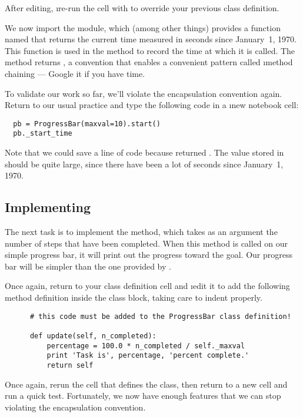 \documentclass[letterpaper, 12pt, titlepage, twoside]{article}
\begin{document}
After editing, \i{re-run the cell} with  to override your
previous class definition.

We now import the  module, which (among other things) provides a
function named  that returns the current time measured in seconds
since January~1, 1970. This function is used in the  method to
record the time at which it is called. The  method returns
, a convention that enables a convenient pattern called \i{method
  chaining} --- Google it if you have time.

To validate our work so far, we'll violate the encapsulation convention again.
Return to our usual practice and type the following code in a \i{new} notebook
cell:

\begin{lstlisting}
  pb = ProgressBar(maxval=10).start()
  pb._start_time
\end{lstlisting}

Note that we could save a line of code because  returned .
The value stored in  should be quite large, since there have
been a lot of seconds since January~1, 1970.

\subsection*{Implementing }

The next task is to implement the  method, which takes as an
argument the number of steps that have been completed. When this method is
called on our simple progress bar, it will print out the progress toward the
goal. Our progress bar will be simpler than the one provided by
.

Once again, return to your class definition cell and \i{edit it to add the
  following method definition inside the class block}, taking care to indent
properly.

\begin{lstlisting}
      # this code must be added to the ProgressBar class definition!

      def update(self, n_completed):
          percentage = 100.0 * n_completed / self._maxval
          print 'Task is', percentage, 'percent complete.'
          return self
\end{lstlisting}

Once again, rerun the cell that defines the class, then return to a new cell
and run a quick test. Fortunately, we now have enough features that we can
stop violating the encapsulation convention.
\end{document}
